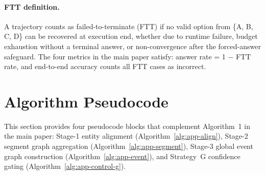 \documentclass[sigconf, screen, review, anonymous]{acmart}
\begin{document}
\paragraph{FTT definition.} A trajectory counts as failed-to-terminate (FTT) if no valid option from \{A, B, C, D\} can be recovered at execution end, whether due to runtime failure, budget exhaustion without a terminal answer, or non-convergence after the forced-answer safeguard. The four metrics in the main paper satisfy: answer rate = 1 $-$ FTT rate, and end-to-end accuracy counts all FTT cases as incorrect.

\section{Algorithm Pseudocode}
\label{sec:algo}

This section provides four pseudocode blocks that complement Algorithm~1 in the
main paper: Stage-1 entity alignment (Algorithm~\ref{alg:app-align}),
Stage-2 segment graph aggregation (Algorithm~\ref{alg:app-segment}),
Stage-3 global event graph construction (Algorithm~\ref{alg:app-event}), and
Strategy~G confidence gating (Algorithm~\ref{alg:app-control-g}).
\end{document}
